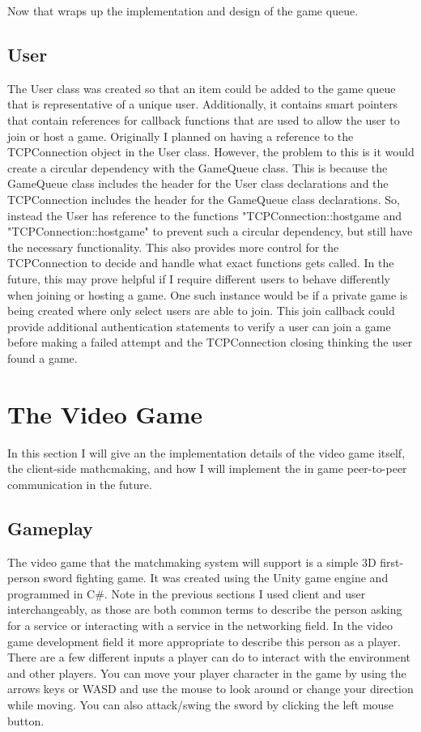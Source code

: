 \documentclass[conference]{IEEEtran}
\begin{document}
Now that wraps up the implementation and design of the game queue.

\subsection{User}
The User class was created so that an item could be added to the game queue that is representative of a unique user.
Additionally, it contains smart pointers that contain references for callback functions that are used to allow the user to join or host a game.
Originally I planned on having a reference to the TCPConnection object in the User class.
However, the problem to this is it would create a circular dependency with the GameQueue class.
This is because the GameQueue class includes the header for the User class declarations and the TCPConnection includes the header for the GameQueue class declarations.
So, instead the User has reference to the functions "TCPConnection::host\textunderscore game and "TCPConnection::host\textunderscore game" to prevent such a circular dependency, but still have the necessary functionality.
This also provides more control for the TCPConnection to decide and handle what exact functions gets called.
In the future, this may prove helpful if I require different users to behave differently when joining or hosting a game.
One such instance would be if a private game is being created where only select users are able to join.
This join callback could provide additional authentication statements to verify a user can join a game before making a failed attempt and the TCPConnection closing thinking the user found a game.

\section{The Video Game}
In this section I will give an the implementation details of the video game itself, the client-side mathcmaking, and how I will implement the in game peer-to-peer communication in the future.
\subsection{Gameplay}
The video game that the matchmaking system will support is a simple 3D first-person sword fighting game.
It was created using the Unity game engine and programmed in C\#.
Note in the previous sections I used  client and user interchangeably, as those are both common terms to describe the person asking for a service or interacting with a service in the networking field.
In the video game development field it more appropriate to describe this person as a player.
There are a few different inputs a player can do to interact with the environment and other players.
You can move your player character in the game by using the arrows keys or WASD and use the mouse to look around or change your direction while moving.
You can also attack/swing the sword by clicking the left mouse button.
\end{document}
